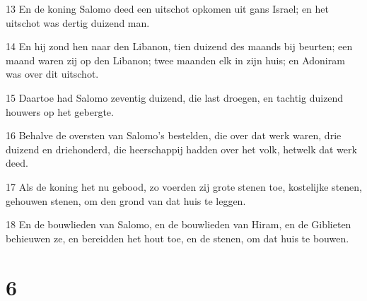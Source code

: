 \par 13 En de koning Salomo deed een uitschot opkomen uit gans Israel; en het uitschot was dertig duizend man.
\par 14 En hij zond hen naar den Libanon, tien duizend des maands bij beurten; een maand waren zij op den Libanon; twee maanden elk in zijn huis; en Adoniram was over dit uitschot.
\par 15 Daartoe had Salomo zeventig duizend, die last droegen, en tachtig duizend houwers op het gebergte.
\par 16 Behalve de oversten van Salomo's bestelden, die over dat werk waren, drie duizend en driehonderd, die heerschappij hadden over het volk, hetwelk dat werk deed.
\par 17 Als de koning het nu gebood, zo voerden zij grote stenen toe, kostelijke stenen, gehouwen stenen, om den grond van dat huis te leggen.
\par 18 En de bouwlieden van Salomo, en de bouwlieden van Hiram, en de Giblieten behieuwen ze, en bereidden het hout toe, en de stenen, om dat huis te bouwen.

\chapter{6}

